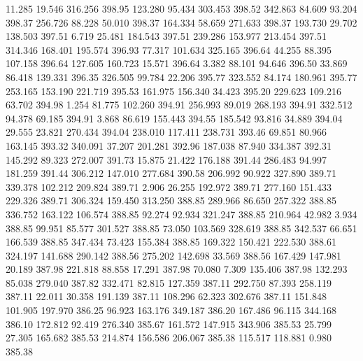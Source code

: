   11.285   19.546  316.256       398.95
 123.280   95.434  303.453       398.52
 342.863   84.609   93.204       398.37
 256.726   88.228   50.010       398.37
 164.334   58.659  271.633       398.37
 193.730   29.702  138.503       397.51
   6.719   25.481  184.543       397.51
 239.286  153.977  213.454       397.51
 314.346  168.401  195.574       396.93
  77.317  101.634  325.165       396.64
  44.255   88.395  107.158       396.64
 127.605  160.723   15.571       396.64
   3.382   88.101   94.646       396.50
  33.869   86.418  139.331       396.35
 326.505   99.784   22.206       395.77
 323.552   84.174  180.961       395.77
 253.165  153.190  221.719       395.53
 161.975  156.340   34.423       395.20
 229.623  109.216   63.702       394.98
   1.254   81.775  102.260       394.91
 256.993   89.019  268.193       394.91
 332.512   94.378   69.185       394.91
   3.868   86.619  155.443       394.55
 185.542   93.816   34.889       394.04
  29.555   23.821  270.434       394.04
 238.010  117.411  238.731       393.46
  69.851   80.966  163.145       393.32
 340.091   37.207  201.281       392.96
 187.038   87.940  334.387       392.31
 145.292   89.323  272.007       391.73
  15.875   21.422  176.188       391.44
 286.483   94.997  181.259       391.44
 306.212  147.010  277.684       390.58
 206.992   90.922  327.890       389.71
 339.378  102.212  209.824       389.71
   2.906   26.255  192.972       389.71
 277.160  151.433  229.326       389.71
 306.324  159.450  313.250       388.85
 289.966   86.650  257.322       388.85
 336.752  163.122  106.574       388.85
  92.274   92.934  321.247       388.85
 210.964   42.982    3.934       388.85
  99.951   85.577  301.527       388.85
  73.050  103.569  328.619       388.85
 342.537   66.651  166.539       388.85
 347.434   73.423  155.384       388.85
 169.322  150.421  222.530       388.61
 324.197  141.688  290.142       388.56
 275.202  142.698   33.569       388.56
 167.429  147.981   20.189       387.98
 221.818   88.858   17.291       387.98
  70.080    7.309  135.406       387.98
 132.293   85.038  279.040       387.82
 332.471   82.815  127.359       387.11
 292.750   87.393  258.119       387.11
  22.011   30.358  191.139       387.11
 108.296   62.323  302.676       387.11
 151.848  101.905  197.970       386.25
  96.923  163.176  349.187       386.20
 167.486   96.115  344.168       386.10
 172.812   92.419  276.340       385.67
 161.572  147.915  343.906       385.53
  25.799   27.305  165.682       385.53
 214.874  156.586  206.067       385.38
 115.517  118.881    0.980       385.38
